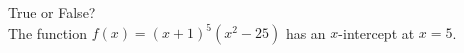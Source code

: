 \documentclass{ximera}
\author{David Kish}
\begin{document}
\begin{exercise}
True or False?\\
The function $f(x) = (x+1)^5(x^2-25)$ has an $x$-intercept at $x=5$.
\begin{multipleChoice}
\end{multipleChoice}


\end{exercise}
\end{document}
